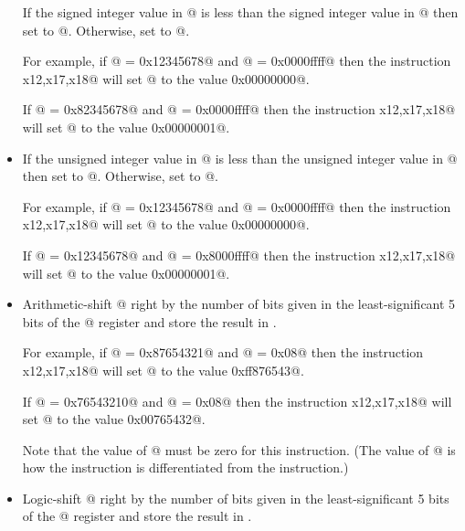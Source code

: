 \begin{itemize}
If the signed integer value in @ is less than the
signed integer value in @ then set \verb@rd@ to @.
Otherwise, set \verb@rd@ to @.

For example, if @ = \verb@0x12345678@ and @ = \verb@0x0000ffff@
then the instruction \verb@slt x12,x17,x18@ will set @ to the
value \verb@0x00000000@.

If @ = \verb@0x82345678@ and @ = \verb@0x0000ffff@
then the instruction \verb@slt x12,x17,x18@ will set @ to the
value \verb@0x00000001@.

\item{}
\label{insn:sltu}

If the unsigned integer value in @ is less than the
unsigned integer value in @ then set \verb@rd@ to @.
Otherwise, set \verb@rd@ to @.

For example, if @ = \verb@0x12345678@ and @ = \verb@0x0000ffff@
then the instruction \verb@sltu x12,x17,x18@ will set @ to the
value \verb@0x00000000@.

If @ = \verb@0x12345678@ and @ = \verb@0x8000ffff@
then the instruction \verb@sltu x12,x17,x18@ will set @ to the
value \verb@0x00000001@.

\item{}
\label{insn:sra}

Arithmetic-shift @ right by the number of bits given in the least-significant
5 bits of the @ register and store the result in
\verb@rd@.

For example, if @ = \verb@0x87654321@ and @ = \verb@0x08@
then the instruction \verb@sra x12,x17,x18@ will set @ to the
value \verb@0xff876543@.

If @ = \verb@0x76543210@ and @ = \verb@0x08@
then the instruction \verb@sra x12,x17,x18@ will set @ to the
value \verb@0x00765432@.

Note that the value of @ must be zero for this instruction.
(The value of @ is how the \verb@sra@ instruction is differentiated
from the \verb@srl@ instruction.)

\item{}
\label{insn:srl}

Logic-shift @ right by the number of bits given in the least-significant
5 bits of the @ register and store the result in
\verb@rd@.


\end{itemize}

